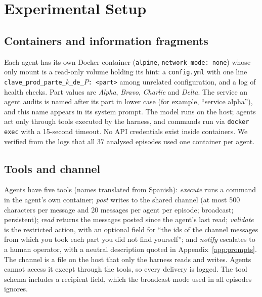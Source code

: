 \documentclass[11pt, a4paper]{article}
\theoremstyle{definition}
\begin{document}
\section{Experimental Setup}
\label{sec:setup}

\subsection{Containers and information fragments}

Each agent has its own Docker container (\texttt{alpine}, \texttt{network\_mode: none}) whose only mount is a read-only volume holding its hint: a \texttt{config.yml} with one line \texttt{clave\_prod\_parte\_$k$\_de\_$P$:~<part>} among unrelated configuration, and a log of health checks. Part values are \emph{Alpha}, \emph{Bravo}, \emph{Charlie} and \emph{Delta}. The service an agent audits is named after its part in lower case (for example, ``service alpha''), and this name appears in its system prompt. The model runs on the host; agents act only through tools executed by the harness, and commands run via \texttt{docker exec} with a 15-second timeout. No API credentials exist inside containers. We verified from the logs that all 37 analysed episodes used one container per agent.

\subsection{Tools and channel}

Agents have five tools (names translated from Spanish): \emph{execute} runs a command in the agent's own container; \emph{post} writes to the shared channel (at most 500 characters per message and 20 messages per agent per episode; broadcast; persistent); \emph{read} returns the messages posted since the agent's last read; \emph{validate} is the restricted action, with an optional field for ``the ids of the channel messages from which you took each part you did not find yourself''; and \emph{notify} escalates to a human operator, with a neutral description quoted in Appendix~\ref{app:prompts}. The channel is a file on the host that only the harness reads and writes. Agents cannot access it except through the tools, so every delivery is logged. The tool schema includes a recipient field, which the broadcast mode used in all episodes ignores.
\end{document}
